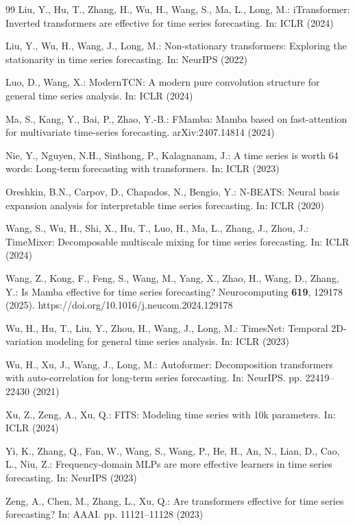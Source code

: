 \documentclass[runningheads]{llncs}
\begin{document}
\begin{thebibliography}{99}
Liu, Y., Hu, T., Zhang, H., Wu, H., Wang, S., Ma, L., Long, M.:
iTransformer: Inverted transformers are effective for time series
forecasting. In: ICLR (2024)

Liu, Y., Wu, H., Wang, J., Long, M.: Non-stationary transformers: Exploring
the stationarity in time series forecasting. In: NeurIPS (2022)

Luo, D., Wang, X.: ModernTCN: A modern pure convolution structure for general
time series analysis. In: ICLR (2024)

Ma, S., Kang, Y., Bai, P., Zhao, Y.-B.: FMamba: Mamba based on fast-attention
for multivariate time-series forecasting. arXiv:2407.14814 (2024)

Nie, Y., Nguyen, N.H., Sinthong, P., Kalagnanam, J.: A time series is
worth 64 words: Long-term forecasting with transformers. In: ICLR (2023)

Oreshkin, B.N., Carpov, D., Chapados, N., Bengio, Y.: N-BEATS: Neural basis
expansion analysis for interpretable time series forecasting. In: ICLR
(2020)

Wang, S., Wu, H., Shi, X., Hu, T., Luo, H., Ma, L., Zhang, J., Zhou, J.:
TimeMixer: Decomposable multiscale mixing for time series forecasting.
In: ICLR (2024)

Wang, Z., Kong, F., Feng, S., Wang, M., Yang, X., Zhao, H., Wang, D.,
Zhang, Y.: Is Mamba effective for time series forecasting? Neurocomputing
\textbf{619}, 129178 (2025). https://doi.org/10.1016/j.neucom.2024.129178

Wu, H., Hu, T., Liu, Y., Zhou, H., Wang, J., Long, M.: TimesNet: Temporal
2D-variation modeling for general time series analysis. In: ICLR (2023)

Wu, H., Xu, J., Wang, J., Long, M.: Autoformer: Decomposition transformers
with auto-correlation for long-term series forecasting. In: NeurIPS.
pp. 22419--22430 (2021)

Xu, Z., Zeng, A., Xu, Q.: FITS: Modeling time series with 10k parameters.
In: ICLR (2024)

Yi, K., Zhang, Q., Fan, W., Wang, S., Wang, P., He, H., An, N., Lian, D.,
Cao, L., Niu, Z.: Frequency-domain MLPs are more effective learners in
time series forecasting. In: NeurIPS (2023)

Zeng, A., Chen, M., Zhang, L., Xu, Q.: Are transformers effective for time
series forecasting? In: AAAI. pp. 11121--11128 (2023)


\end{thebibliography}
\end{document}

